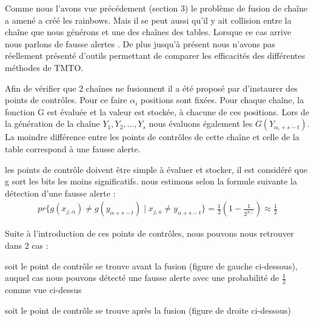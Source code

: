	Comme nous l'avons vue précédement (section 3) le problème de fusion de chaîne a amené a créé les \glspl{rainbow}. Mais il se peut aussi qu'il y ait collision entre la chaîne que nous générons et une des chaînes des tables. Lorsque ce cas arrive nous parlons de fausse alertes \cite{checkpoints}.
	De plus jusqu'à présent nous n'avons pas réellement présenté d'outils permettant de comparer les efficacités des différentes méthodes de \gls{TMTO}.

	Afin de vérifier que 2 chaînes ne fusionnent il a été proposé par \cite{checkpoints} d'instaurer des points de contrôles. Pour ce faire $\alpha_i$ positions sont fixées. Pour chaque chaîne, la fonction G est évaluée et la valeur est stockée, à chacune de ces positions. Lors de la génération de la chaîne $Y_1,Y_2,\ldots{},Y_s$ nous évaluons également les $G(Y_{\alpha_i+s-t})$. La moindre différence entre les points de contrôles de cette chaîne et celle de la table correspond à une fausse alerte.


	\bigskip
	
	les points de contrôle doivent être simple à évaluer et stocker, il est considéré que g sort les bits les moins significatifs. nous estimons selon la formule suivante la détection d'une fausse alerte :
\begin{align*}
pr\{g(x_{j,\alpha}) \neq g(y_{\alpha +s-t}) \mid x_{j,a} \neq y_{\alpha+s-t}\}=\frac{1}{2}(1-\frac{1}{2^{\mid k \mid}}) \approx \frac{1}{2}
\end{align*}

	Suite à l'introduction de ces points de contrôles, nous pouvons nous retrouver dans 2 cas :
	\bi
\item soit le point de contrôle se trouve avant la fusion (figure de gauche ci-dessous), auquel cas nous pouvons détecté une fausse alerte avec une probabilité de $\frac{1}{2}$ comme vue ci-dessus
\item soit le point de contrôle se trouve après la fusion (figure de droite ci-dessous)
	\ei

